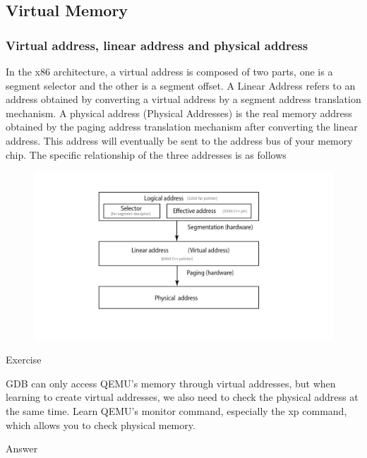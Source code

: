 \subsection{Virtual Memory}
\subsubsection{Virtual address, linear address and physical address}

In the x86 architecture, a virtual address is composed of two parts, one is a segment selector and the other is a segment offset. A Linear Address refers to an address obtained by converting a virtual address by a segment address translation mechanism. A physical address (Physical Addresses) is the real memory address obtained by the paging address translation mechanism after converting the linear address. This address will eventually be sent to the address bus of your memory chip. The specific relationship of the three addresses is as follows
\begin{figure}[H]
\centering
\includegraphics[width=0.8\linewidth]{figure/virtual_linear_physical_address}
\end{figure}

\begin{flushleft}
{\Large Exercise}
\end{flushleft}

GDB can only access QEMU's memory through virtual addresses, but when learning to create virtual addresses, we also need to check the physical address at the same time. Learn QEMU's monitor command, especially the xp command, which allows you to check physical memory.

\begin{flushleft}
{\Large Answer}
\end{flushleft}

